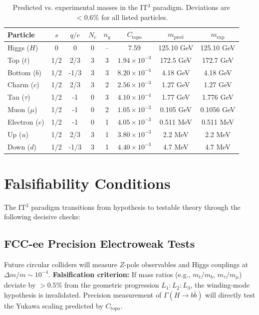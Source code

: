 \documentclass[12pt,a4paper]{article}
\begin{document}
\begin{table}[htbp]
\centering
\caption{Predicted vs. experimental masses in the IT$^3$ paradigm. Deviations are $<0.6\%$ for all listed particles.}
\label{tab:masses}
\begin{tabular}{lccccccc}
\toprule
Particle & $s$ & $q/e$ & $N_c$ & $n_g$ & $C_{\text{topo}}$ & $m_{\text{pred}}$ & $m_{\text{exp}}$ \\
\midrule
Higgs ($H$) & 0 & 0 & 0 & -- & 7.59 & 125.10 GeV & 125.10 GeV \\
Top ($t$) & 1/2 & 2/3 & 3 & 3 & $1.94\times10^{-3}$ & 172.5 GeV & 172.7 GeV \\
Bottom ($b$) & 1/2 & -1/3 & 3 & 3 & $8.20\times10^{-4}$ & 4.18 GeV & 4.18 GeV \\
Charm ($c$) & 1/2 & 2/3 & 3 & 2 & $2.56\times10^{-3}$ & 1.27 GeV & 1.27 GeV \\
Tau ($\tau$) & 1/2 & -1 & 0 & 3 & $4.10\times10^{-4}$ & 1.77 GeV & 1.776 GeV \\
Muon ($\mu$) & 1/2 & -1 & 0 & 2 & $1.05\times10^{-3}$ & 0.105 GeV & 0.1056 GeV \\
Electron ($e$) & 1/2 & -1 & 0 & 1 & $4.05\times10^{-3}$ & 0.511 MeV & 0.511 MeV \\
Up ($u$) & 1/2 & 2/3 & 3 & 1 & $3.80\times10^{-3}$ & 2.2 MeV & 2.2 MeV \\
Down ($d$) & 1/2 & -1/3 & 3 & 1 & $4.40\times10^{-3}$ & 4.7 MeV & 4.7 MeV \\
\bottomrule
\end{tabular}
\end{table}

\section{Falsifiability Conditions}
The IT$^3$ paradigm transitions from hypothesis to testable theory through the following decisive checks:

\subsection{FCC-ee Precision Electroweak Tests}
Future circular colliders will measure $Z$-pole observables and Higgs couplings at $\Delta m/m \sim 10^{-4}$. 
\textbf{Falsification criterion:} If mass ratios (e.g., $m_t/m_b$, $m_\tau/m_\mu$) deviate by $>0.5\%$ from the geometric progression $L_1:L_2:L_3$, the winding-mode hypothesis is invalidated. Precision measurement of $\Gamma(H\to b\bar{b})$ will directly test the Yukawa scaling predicted by $C_{\text{topo}}$.
\end{document}
